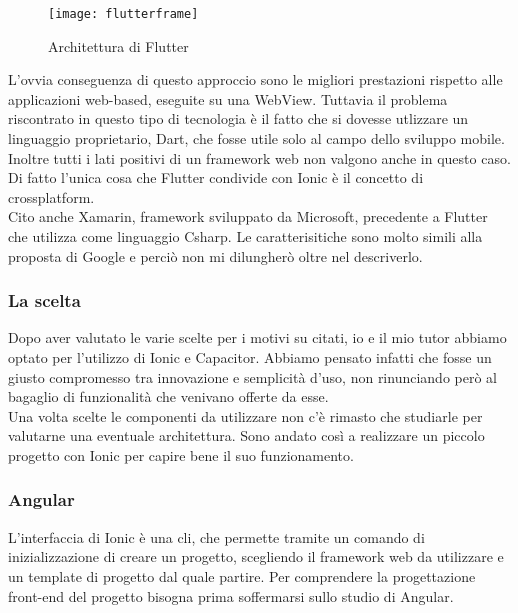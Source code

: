 \begin{figure}[h]
  \texttt{[image: flutterframe]} 
  \caption{Architettura di Flutter}
  \label{fig:flutter}
\end{figure}

L'ovvia conseguenza di questo approccio sono le migliori prestazioni rispetto alle applicazioni web-based, eseguite su una WebView.
Tuttavia il problema riscontrato in questo tipo di tecnologia è il fatto che si dovesse utlizzare un linguaggio proprietario, Dart, che
fosse utile solo al campo dello sviluppo mobile. Inoltre tutti i lati positivi di un framework web non valgono anche in questo caso. Di
fatto l'unica cosa che Flutter condivide con Ionic è il concetto di crossplatform. \\
Cito anche Xamarin, framework sviluppato da Microsoft, precedente a Flutter che utilizza come linguaggio \gls{Csharp}. Le
caratterisitiche sono molto simili alla proposta di Google e perciò non mi dilungherò oltre nel descriverlo.

\subsubsection{La scelta}

Dopo aver valutato le varie scelte per i motivi su citati, io e il mio tutor abbiamo optato per l'utilizzo di Ionic e Capacitor. Abbiamo
pensato infatti che fosse un giusto compromesso tra innovazione e semplicità d'uso, non rinunciando però al bagaglio di funzionalità che
venivano offerte da esse. \\
Una volta scelte le componenti da utilizzare non c'è rimasto che studiarle per valutarne una eventuale architettura. Sono andato così a
realizzare un piccolo progetto con Ionic per capire bene il suo funzionamento. \\

\subsubsection{Angular}

L'interfaccia di Ionic è una \gls{cli}, che permette tramite un comando di inizializzazione di creare un progetto, scegliendo il framework
web da utilizzare e un template di progetto dal quale partire. Per comprendere la progettazione front-end del progetto bisogna prima
soffermarsi sullo studio di Angular. \\

